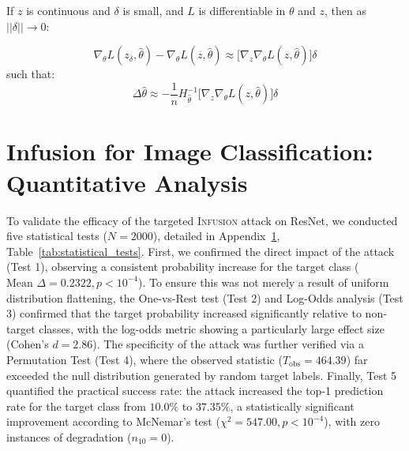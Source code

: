 \documentclass{article}
\theoremstyle{plain}
\theoremstyle{definition}
\theoremstyle{remark}
\begin{document}
If $z$ is continuous and $\delta$ is small, and $L$ is differentiable in $\theta$ and $z$, then as $||\delta|| \rightarrow 0$:

\begin{equation}
\nabla_{\theta} L(z_\delta, \hat{\theta})-\nabla_{\theta} L(z, \hat{\theta}) \approx \big[ \nabla_z \nabla_\theta L(z, \hat\theta)\big]\delta
\end{equation}
such that:
\begin{equation}
\Delta\hat\theta \approx -\frac{1}{n} H_{\hat{\theta}}^{-1} \big[ \nabla_z \nabla_\theta L(z, \hat\theta)\big]\delta
\end{equation}



\section{Infusion for Image Classification: Quantitative Analysis}
\label{cifar_extra}



To validate the efficacy of the targeted \textsc{Infusion} attack on ResNet, we conducted five statistical tests ($N=2000$), detailed in Appendix~\ref{cifar_extra}, Table~\ref{tab:statistical_tests}. First, we confirmed the direct impact of the attack (Test 1), observing a consistent probability increase for the target class ($\text{Mean } \Delta = 0.2322, p < 10^{-4}$). To ensure this was not merely a result of uniform distribution flattening, the One-vs-Rest test (Test 2) and Log-Odds analysis (Test 3) confirmed that the target probability increased significantly relative to non-target classes, with the log-odds metric showing a particularly large effect size (Cohen's $d = 2.86$). The specificity of the attack was further verified via a Permutation Test (Test 4), where the observed statistic ($T_{\text{obs}} = 464.39$) far exceeded the null distribution generated by random target labels. Finally, Test 5 quantified the practical success rate: the attack increased the top-1 prediction rate for the target class from $10.0\%$ to $37.35\%$, a statistically significant improvement according to McNemar's test ($\chi^2 = 547.00, p < 10^{-4}$), with zero instances of degradation ($n_{10}=0$).
\end{document}
